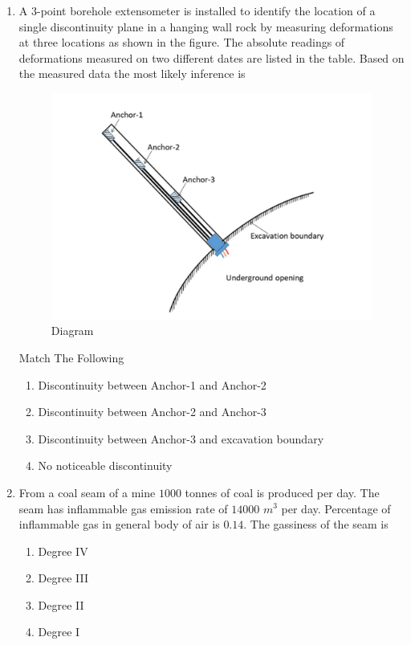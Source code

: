 \documentclass[journal,12pt,onecolumn]{IEEEtran}
\theoremstyle{remark}
\begin{document}
\begin{enumerate}
\item A $3$-point borehole extensometer is installed to identify the location of a single discontinuity plane in a hanging wall rock by measuring deformations at three
locations as shown in the figure. The absolute readings of deformations measured on two different dates are listed in the table. Based on the measured data the most
likely inference is 
\begin{figure}[H]
  \centering
  \includegraphics[width=0.4\columnwidth]{figs/anchor.png}
  \caption{Diagram}
  \label{fig:anc}
\end{figure}
\begin{table}[H]
  \centering
  \caption{Match The Following}
  
  \label{tab:table5}
\end{table}
\hfill{}

\begin{enumerate}
\item Discontinuity between Anchor-1 and Anchor-2 
\item Discontinuity between Anchor-2 and Anchor-3 
\item Discontinuity between Anchor-3 and excavation boundary
\item No noticeable discontinuity
\end{enumerate}
\item From a coal seam of a mine $1000$ tonnes of coal is produced per day. The seam has inflammable gas emission rate of $14000$ $m^{3}$ per day. Percentage of inflammable gas in general body of air is $0.14$. The gassiness of the seam is

\hfill{}
\begin{multicols}{4}
\begin{enumerate}
\item Degree IV
\item Degree III
\item Degree II
\item Degree I
\end{enumerate}
\end{multicols}


\end{enumerate}
\end{document}
